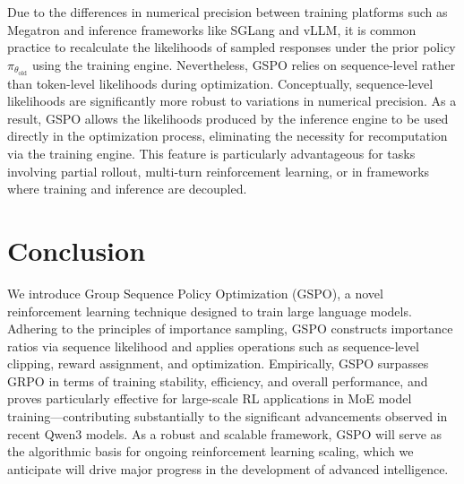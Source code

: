 Due to the differences in numerical precision between training platforms such as Megatron and inference frameworks like SGLang and vLLM, it is common practice to recalculate the likelihoods of sampled responses under the prior policy $\pi_{\theta_\text{old}}$ using the training engine. Nevertheless, GSPO relies on sequence-level rather than token-level likelihoods during optimization. Conceptually, sequence-level likelihoods are significantly more robust to variations in numerical precision. As a result, GSPO allows the likelihoods produced by the inference engine to be used directly in the optimization process, eliminating the necessity for recomputation via the training engine. This feature is particularly advantageous for tasks involving partial rollout, multi-turn reinforcement learning, or in frameworks where training and inference are decoupled.

\section{Conclusion}

We introduce Group Sequence Policy Optimization (GSPO), a novel reinforcement learning technique designed to train large language models. Adhering to the principles of importance sampling, GSPO constructs importance ratios via sequence likelihood and applies operations such as sequence-level clipping, reward assignment, and optimization. Empirically, GSPO surpasses GRPO in terms of training stability, efficiency, and overall performance, and proves particularly effective for large-scale RL applications in MoE model training—contributing substantially to the significant advancements observed in recent Qwen3 models. As a robust and scalable framework, GSPO will serve as the algorithmic basis for ongoing reinforcement learning scaling, which we anticipate will drive major progress in the development of advanced intelligence.


